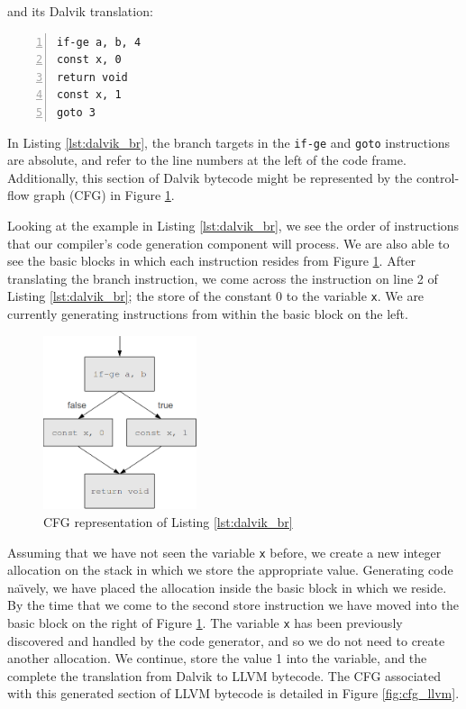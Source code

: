 and its Dalvik translation:

\lstset{
	language=Assembly,
	basicstyle=\small,
	stringstyle=\ttfamily
}

\begin{lstlisting}[frame=single, numbers=left, numberstyle=\tiny, caption={Dalvik code for Listing \ref{lst:java_br}}, label=lst:dalvik_br]
if-ge a, b, 4
const x, 0
return void
const x, 1
goto 3
\end{lstlisting}

In Listing \ref{lst:dalvik_br}, the branch targets in the \verb|if-ge| and \verb|goto| instructions are absolute, and refer to the line numbers at the left of the code frame. Additionally, this section of Dalvik bytecode might be represented by the control-flow graph (CFG) in Figure \ref{fig:cfg_dalvik}.

Looking at the example in Listing \ref{lst:dalvik_br}, we see the order of instructions that our compiler's code generation component will process. We are also able to see the basic blocks in which each instruction resides from Figure \ref{fig:cfg_dalvik}. After translating the branch instruction, we come across the instruction on line 2 of Listing \ref{lst:dalvik_br}; the store of the constant 0 to the variable \verb|x|. We are currently generating instructions from within the basic block on the left.

\begin{figure}[h!]
    \centering
    \includegraphics[width=0.4\textwidth]{images/cfg_dalvik.png}
    \caption{CFG representation of Listing \ref{lst:dalvik_br}}
    \label{fig:cfg_dalvik}
\end{figure}

Assuming that we have not seen the variable \verb|x| before, we create a new integer allocation on the stack in which we store the appropriate value. Generating code na\"{\i}vely, we have placed the allocation inside the basic block in which we reside. By the time that we come to the second store instruction we have moved into the basic block on the right of Figure \ref{fig:cfg_dalvik}. The variable \verb|x| has been previously discovered and handled by the code generator, and so we do not need to create another allocation. We continue, store the value 1 into the variable, and the complete the translation from Dalvik to LLVM bytecode. The CFG associated with this generated section of LLVM bytecode is detailed in Figure \ref{fig:cfg_llvm}.

